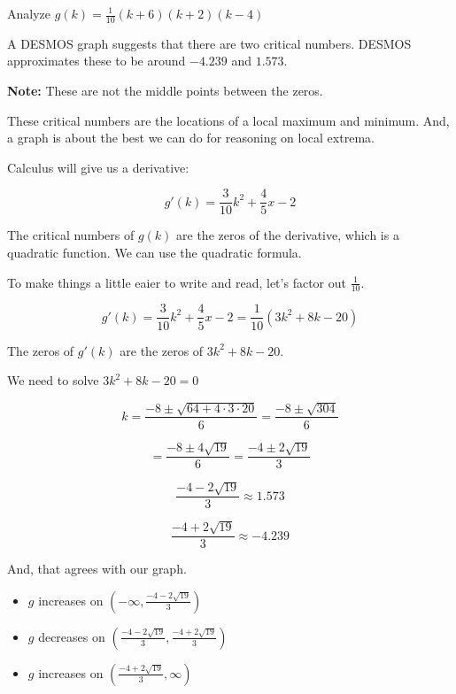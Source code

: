 \documentclass{ximera}
\begin{document}
\begin{example}  Analyze   $g(k) = \frac{1}{10} (k+6)(k+2)(k-4)$




A DESMOS graph suggests that there are two critical numbers.  DESMOS approximates these to be around $-4.239$ and $1.573$.

\textbf{Note: } These are not the middle points between the zeros.


These critical numbers are the locations of a local maximum and minimum.  And, a graph is about the best we can do for reasoning on local extrema.





\begin{center}
\end{center}








Calculus will give us a derivative:

\[  g'(k) = \frac{3}{10} k^2 + \frac{4}{5} x - 2  \]



The critical numbers of $g(k)$ are the zeros of the derivative, which is a quadratic function. We can use the quadratic formula.




To make things a little eaier to write and read, let's factor out $\frac{1}{10}$.


\[    g'(k) = \frac{3}{10} k^2 + \frac{4}{5} x - 2  =  \frac{1}{10} ( 3 k^2 + 8 k - 20 )   \]


The zeros of $g'(k)$ are the zeros of $3 k^2 + 8 k - 20$.

We need to solve $3 k^2 + 8 k - 20 = 0$


\[  k = \frac{-8 \pm \sqrt{64 + 4 \cdot 3 \cdot 20}}{6}  = \frac{-8 \pm \sqrt{304}}{6} \]


\[   = \frac{-8 \pm 4 \sqrt{19}}{6}   = \frac{-4 \pm 2 \sqrt{19}}{3}      \]



\[   \frac{-4 - 2 \sqrt{19}}{3}  \approx   1.573    \]


\[   \frac{-4 + 2 \sqrt{19}}{3}  \approx   -4.239   \]


And, that agrees with our graph.




\begin{itemize}
\item  $g$ increases on $\left( -\infty, \frac{-4 - 2 \sqrt{19}}{3} \right)$ 
\item  $g$ decreases on $\left( \frac{-4 - 2 \sqrt{19}}{3}, \frac{-4 + 2 \sqrt{19}}{3}  \right)$ 
\item  $g$ increases on $\left( \frac{-4 + 2 \sqrt{19}}{3}, \infty \right)$ 
\end{itemize}





\end{example}
\end{document}
